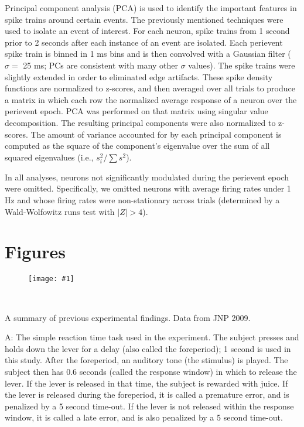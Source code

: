 \documentclass[12pt]{article}
\newcommand{\scalefigone}[3]{
  \begin{figure}[ht!]
    \centering
    \texttt{[image: \#1]}
    \caption{#3}
    \label{#1}
  \end{figure}}
\begin{document}
Principal component analysis (PCA)
is used to identify the important features
in spike trains around certain events.
The previously mentioned techniques
were used to isolate an event of interest.
For each neuron, spike trains from 1 second prior to
2 seconds after each instance of an event are isolated.
Each perievent spike train is binned in 1 ms bins and is then
convolved with a Gaussian filter ($\sigma = $ 25 ms;
PCs are consistent with many other $\sigma$ values).
The spike trains were slightly extended
in order to eliminated edge artifacts.
These spike density functions
are normalized to z-scores,
and then averaged over all trials to
produce a matrix in which each row
the normalized average response of a neuron
over the perievent epoch.
PCA was performed on that matrix
using singular value decomposition.
The resulting principal components
were also normalized to z-scores.
The amount of variance accounted for by each principal component
is computed as the square of the component's eigenvalue
over the sum of all squared eigenvalues
(i.e., $s_i^2 / \sum s^2$).

In all analyses, neurons not significantly modulated
during the perievent epoch were omitted.
Specifically, we omitted neurons with average firing rates
under 1 Hz and whose firing rates were non-stationary
across trials
(determined by a Wald-Wolfowitz runs test with $|Z| > 4$).

\clearpage

\section{Figures}

\scalefigone{f1.png}{1.0}{~}

A summary of previous experimental findings. Data from JNP 2009.

A: The simple reaction time task used in the experiment.
The subject presses and holds down the lever
for a delay (also called the foreperiod);
1 second is used in this study.
After the foreperiod, an auditory tone (the stimulus) is played.
The subject then has 0.6 seconds (called the response window)
in which to release the lever.
If the lever is released in that time,
the subject is rewarded with juice.
If the lever is released during the foreperiod,
it is called a premature error,
and is penalized by a 5 second time-out. %
If the lever is not released within the response window,
it is called a late error,
and is also penalized by a 5 second time-out.
\end{document}
